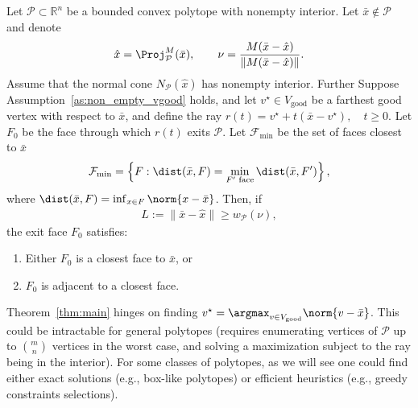 \begin{theorem}
\label{thm:main}
Let $\mathcal P \subset \mathbb R^n$ be a bounded convex polytope with nonempty interior.
Let $\bar x \notin \mathcal P$ and denote
\begin{align}\label{eq:xhat_and_nu}
\hat x = \Proj_{\mathcal P}^M(\bar x), \qquad
\nu = \frac{M(\bar x - \hat x)}{\|M(\bar x - \hat x)\|}.
\end{align}
Assume that the normal cone $N_{\mathcal P}(\hat x)$ has nonempty interior. Further Suppose Assumption~\ref{as:non_empty_vgood} holds, and 
let $v^\star \in V_
\text{good}$ be a farthest good vertex with respect to $\bar x$, and define the ray
$
r(t) = v^\star + t(\bar x - v^\star), \quad t \ge 0.
$
Let $F_0$ be the face through which $r(t)$ exits $\mathcal P$. Let $\mathcal{F}_{\min}$ be the set of faces closest to $\bar{x}$
\begin{equation}\label{eq:closest_faces}
\mathcal{F}_{\min} = \left\{F : \dist(\bar{x}, F) = \min_{F' \text{ face}} \dist(\bar{x}, F')\right\},
\end{equation}
where $\dist(\bar{x}, F) = \inf_{x \in F} \norm{x - \bar{x}}$.
Then, if
\begin{align}\label{eq:L_bound}
L := \|\bar x - \hat x\| \ge w_{\mathcal P}(\nu),
\end{align}
the exit face $F_0$ satisfies:
\begin{enumerate}
    \item Either $F_0$ is a closest face to $\bar x$, or
    \item $F_0$ is adjacent to a closest face.
\end{enumerate}
\end{theorem}


\begin{remark}\label{rem:good_vertex_is_hard}
Theorem~\ref{thm:main} hinges on finding $v^\star = \argmax_{v \in V_{\text{good}}} \norm{v - \bar{x}}$. This could be intractable for general polytopes (requires
    enumerating vertices of $\mathcal{P}$ up to $\binom{m}{n}$ vertices in the worst case, and solving a maximization subject to the ray being in the interior). For some classes of polytopes, as we will see one could find either exact solutions (e.g., box-like polytopes) or efficient heuristics (e.g., greedy constraints selections).  
\end{remark}

